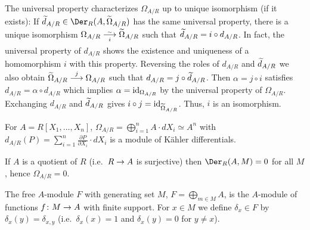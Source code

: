\documentclass[a4paper,parskip=half,numbers=enddot, DIV=12]{scrreprt}
\begin{document}
\begin{rem*}
    \begin{alphanumerate}
        \item 
            The universal property characterizes $\Omega_{A/R}$ up to unique isomorphism (if it exists): If $\snake d_{A/R} \in\Der_R(A,\snake \Omega_{A/R})$ has the same universal property, there is a unique isomorphism $\Omega_{A/R}\isomorphism[i] \snake \Omega_{A/R}$ such that $\snake d _{A/R} = i \circ d_{A/R}$. In fact, the universal property of $d_{A/R}$ shows the existence and uniqueness of a homomorphism $i$ with this property. Reversing the roles of $d_{A/R}$ and $\snake d_{A/R}$ we also obtain $\snake\Omega_{A/R} \morphism[j]\Omega_{A/R}$ such that $d_{A/R} = j\circ \snake d_{A/R}$. Then $\alpha = j\circ i$ satisfies $d_{A/R} = \alpha\circ d_{A/R}$ which implies $\alpha= \operatorname{id}_{\Omega_{A/R}}$ by the universal property of $\Omega_{A/R}$. Exchanging $d_{A/R}$ and $\snake d_{A/R}$ gives $i \circ j = \id_{\snake\Omega_{A/R}}$. Thus, $i$ is an isomorphism.
        \item
            For $A= R[X_1,\ldots,X_n]$, $\Omega_{A/R} = \bigoplus_{i=1}^n A\cdot dX_i \simeq A^n$ with $d_{A/R} (P) = \sum_{i=1}^n \frac{\partial P }{\partial X_i} \cdot dX_i$ is a module of Kähler differentials.
        \item 
            If $A$ is a quotient of $R$ (i.e.\ $R\morphism A$ is surjective) then $\Der_R(A,M) = 0$ for all $M$, hence $\Omega_{A/R} = 0$.
    \end{alphanumerate}
\end{rem*}
\begin{defi} 
    The free $A$-module $F$ with generating set $M$, $F=\bigoplus_{m\in M}A$, is the $A$-module of functions $f\colon M \morphism A$ with finite support. For $x\in M$ we define $\delta_x \in F$ by $\delta_x(y) = \delta_{x,y}$ (i.e.\ $\delta_x(x)=1$ and $\delta_x(y)=0$ for $y\not=x$).
\end{defi}
\end{document}
